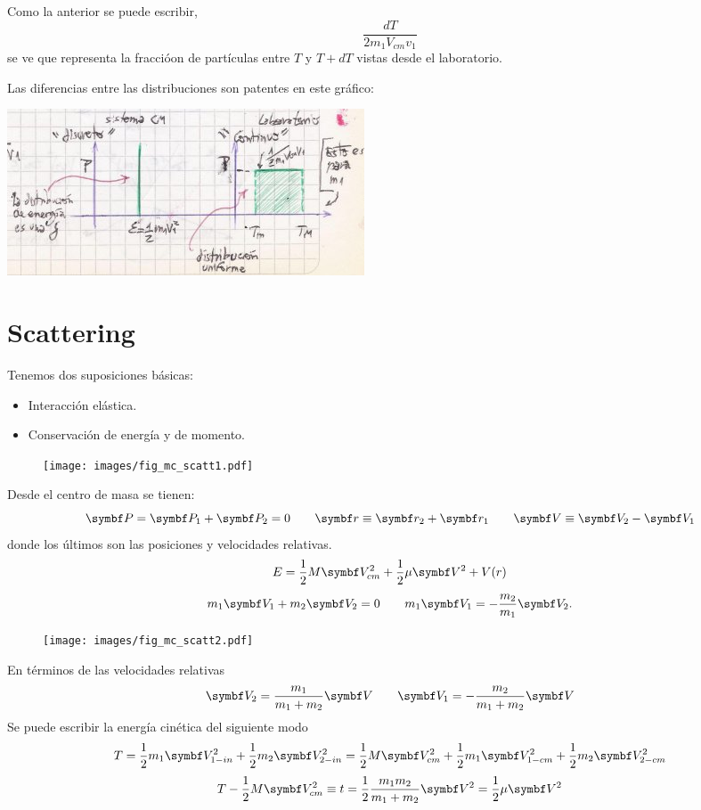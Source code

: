 \documentclass[10pt,oneside]{CBFT_book}
\begin{document}
Como la anterior se puede escribir,
\[
	\frac{dT}{2 m_1 V_{cm} v_1}
\]
se ve que representa la fraccióon de partículas entre $T$ y $T+dT$ vistas desde el laboratorio.

Las diferencias entre las distribuciones son patentes en este gráfico:

\includegraphics[scale=0.4]{images/fig_mc_dispersion_distribuciones.jpg}

\section{Scattering}

Tenemos dos suposiciones básicas:
	\begin{itemize}
		\item Interacción elástica.
		\item Conservación de energía y de momento.
	\end{itemize}

\begin{figure}[htb]
	\begin{center}
	\texttt{[image: images/fig\_mc\_scatt1.pdf]}	 
	\end{center}
	\caption{}
\end{figure} 	
	
Desde el centro de masa se tienen:
\[
	\vb{P} = \vb{P}_1 + \vb{P}_2 = 0	\qquad		\vb{r} \equiv \vb{r}_2 + \vb{r}_1
	\qquad		\vb{V} \equiv \vb{V}_2 - \vb{V}_1
\]
donde los últimos son las posiciones y velocidades relativas.
\[
	E = \frac{1}{2} M \vb{V}_{cm}^2 + \frac{1}{2} \mu \vb{V}^2 + V(r)
\]
\[
	m_1 \vb{V}_1 + m_2 \vb{V}_2 = 0 \qquad m_1 \vb{V}_1 = -\frac{m_2}{m_1} \vb{V}_2.
\]
\begin{figure}[htb]
	\begin{center}
	\texttt{[image: images/fig\_mc\_scatt2.pdf]}	 
	\end{center}
	\caption{}
\end{figure} 
En términos de las velocidades relativas
\[
	\vb{V}_2 = \frac{m_1}{m_1 + m_2} \vb{V} \qquad \vb{V}_1 = -\frac{m_2}{m_1 + m_2} \vb{V}
\]
Se puede escribir la energía cinética del siguiente modo
\[
	T = \frac{1}{2} m_1 \vb{V}_{1-in}^2 + \frac{1}{2} m_2 \vb{V}_{2-in}^2 =
	\frac{1}{2} M \vb{V}_{cm}^2 + \frac{1}{2} m_1 \vb{V}_{1-cm}^2 + \frac{1}{2} m_2 \vb{V}_{2-cm}^2 
\]
\[
	T - \frac{1}{2} M \vb{V}_{cm}^2 \equiv t = \frac{1}{2} \frac{m_1 m_2}{m_1 + m_2} \vb{V}^2 =
							\frac{1}{2} \mu \vb{V}^2
\]
\end{document}
